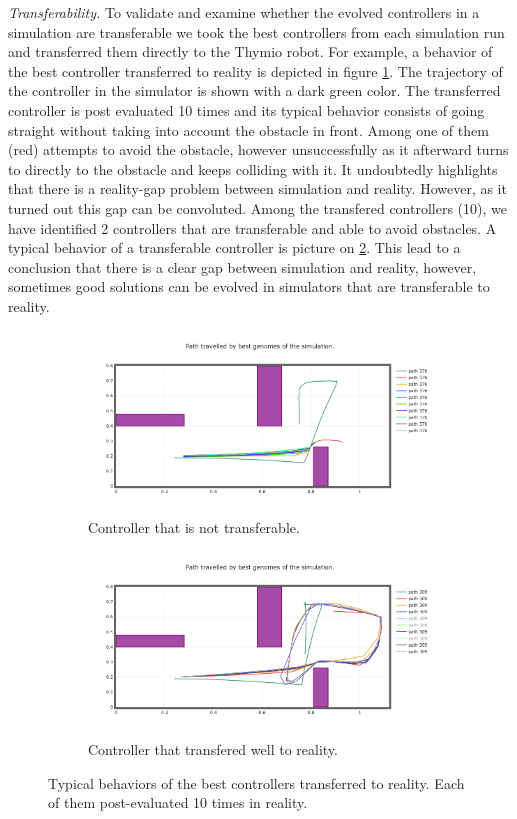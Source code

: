 \emph{Transferability.} To validate and examine whether the evolved controllers in a simulation are transferable we took the best controllers from each simulation run and transferred them directly to the Thymio robot. For example, a behavior of the best controller transferred to reality is depicted in figure \ref{fig:sim_bad_transfer}. The trajectory of the controller in the simulator is shown with a dark green color. The transferred controller is post evaluated 10 times and its typical behavior consists of going straight without taking into account the obstacle in front. Among one of them (red) attempts to avoid the obstacle, however unsuccessfully as it afterward turns to directly to the obstacle and keeps colliding with it. It undoubtedly highlights that there is a reality-gap problem between simulation and reality. However, as it turned out this gap can be convoluted. Among the transfered controllers (10), we have identified 2 controllers that are transferable and able to avoid obstacles. A typical behavior of a transferable controller is picture on \ref{fig:sim_good_transfer}. This lead to a conclusion that there is a clear gap between simulation and reality, however, sometimes good solutions can be evolved in simulators that are transferable to reality.

\begin{figure}[H]
    \centering
    \begin{subfigure}[b]{0.8\textwidth}
    	\centering
        \includegraphics[width=10cm]{include/images/sim_bad_transfer.PNG}
        \caption{Controller that is not transferable.}
        \label{fig:sim_bad_transfer}
    \end{subfigure}
    \begin{subfigure}[b]{0.8\textwidth}
    	\centering
        \includegraphics[width=10cm]{include/images/sim_good_transfer.PNG}
        \caption{Controller that transfered well to reality.}
        \label{fig:sim_good_transfer}
    \end{subfigure}
    \caption{Typical behaviors of the best controllers transferred to reality. Each of them post-evaluated 10 times in reality.}
	\label{fig:transferred_controllers}
\end{figure}

